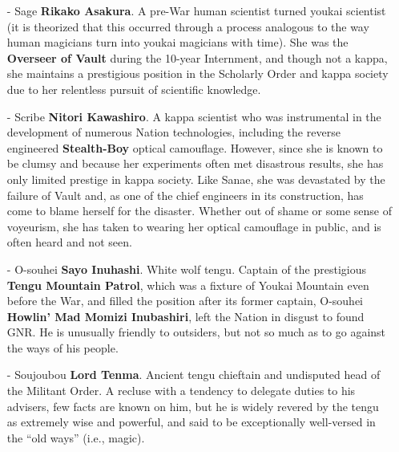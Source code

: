\documentclass[a4paper,12pt]{book}
\newcommand{\maru}[1]{\raisebox{.5pt}{\textcircled{\raisebox{-.9pt} {#1}}}}
\begin{document}
\begin{itemize}
\item[-] Sage \textbf{Rikako Asakura}. A pre-War human scientist turned youkai scientist (it is theorized that this occurred through a process analogous to the way human magicians turn into youkai magicians with time). She was the \textbf{Overseer of Vault \maru{11}} during the 10-year Internment, and though not a kappa, she maintains a prestigious position in the Scholarly Order and kappa society due to her relentless pursuit of scientific knowledge.
\item[-] Scribe \textbf{Nitori Kawashiro}. A kappa scientist who was instrumental in the development of numerous Nation technologies, including the reverse engineered \textbf{Stealth-Boy} optical camouflage. However, since she is known to be clumsy and because her experiments often met disastrous results, she has only limited prestige in kappa society. Like Sanae, she was devastated by the failure of Vault \maru{13} and, as one of the chief engineers in its construction, has come to blame herself for the disaster. Whether out of shame or some sense of voyeurism, she has taken to wearing her optical camouflage in public, and is often heard and not seen.
\item[-] O-souhei \textbf{Sayo Inuhashi}. White wolf tengu. Captain of the prestigious \textbf{Tengu Mountain Patrol}, which was a fixture of Youkai Mountain even before the War, and filled the position after its former captain, O-souhei \textbf{Howlin' Mad Momizi Inubashiri}, left the Nation in disgust to found GNR. He is unusually friendly to outsiders, but not so much as to go against the ways of his people.
\item[-] Soujoubou \textbf{Lord Tenma}. Ancient tengu chieftain and undisputed head of the Militant Order. A recluse with a tendency to delegate duties to his advisers, few facts are known on him, but he is widely revered by the tengu as extremely wise and powerful, and said to be exceptionally well-versed in the ``old ways'' (i.e., magic).
\end{itemize}
\end{document}

